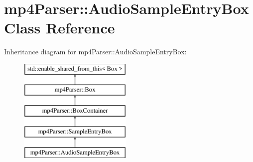 \hypertarget{classmp4_parser_1_1_audio_sample_entry_box}{}\section{mp4\+Parser\+::Audio\+Sample\+Entry\+Box Class Reference}
\label{classmp4_parser_1_1_audio_sample_entry_box}
Inheritance diagram for mp4\+Parser\+::Audio\+Sample\+Entry\+Box\+:\begin{figure}[H]
\begin{center}
\leavevmode
\includegraphics[height=5.000000cm]{classmp4_parser_1_1_audio_sample_entry_box}
\end{center}
\end{figure}
